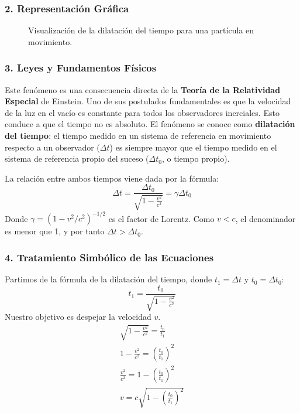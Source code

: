 \subsubsection*{2. Representación Gráfica}
\begin{figure}[H]
    \centering
    \caption{Visualización de la dilatación del tiempo para una partícula en movimiento.}
\end{figure}

\subsubsection*{3. Leyes y Fundamentos Físicos}
Este fenómeno es una consecuencia directa de la \textbf{Teoría de la Relatividad Especial} de Einstein. Uno de sus postulados fundamentales es que la velocidad de la luz en el vacío es constante para todos los observadores inerciales. Esto conduce a que el tiempo no es absoluto.
El fenómeno se conoce como \textbf{dilatación del tiempo}: el tiempo medido en un sistema de referencia en movimiento respecto a un observador ($\Delta t$) es siempre mayor que el tiempo medido en el sistema de referencia propio del suceso ($\Delta t_0$, o tiempo propio).

La relación entre ambos tiempos viene dada por la fórmula:
$$\Delta t = \frac{\Delta t_0}{\sqrt{1 - \frac{v^2}{c^2}}} = \gamma \Delta t_0$$
Donde $\gamma = (1 - v^2/c^2)^{-1/2}$ es el factor de Lorentz. Como $v < c$, el denominador es menor que 1, y por tanto $\Delta t > \Delta t_0$.

\subsubsection*{4. Tratamiento Simbólico de las Ecuaciones}
Partimos de la fórmula de la dilatación del tiempo, donde $t_1 = \Delta t$ y $t_0 = \Delta t_0$:
$$t_1 = \frac{t_0}{\sqrt{1 - \frac{v^2}{c^2}}}$$
Nuestro objetivo es despejar la velocidad $v$.
\begin{gather}
    \sqrt{1 - \frac{v^2}{c^2}} = \frac{t_0}{t_1} \nonumber \\
    1 - \frac{v^2}{c^2} = \left(\frac{t_0}{t_1}\right)^2 \nonumber \\
    \frac{v^2}{c^2} = 1 - \left(\frac{t_0}{t_1}\right)^2 \nonumber \\
    v = c \sqrt{1 - \left(\frac{t_0}{t_1}\right)^2}
\end{gather}

